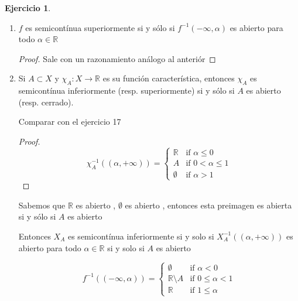 \documentclass[11pt]{report}
\newcommand{\R}{\mathbb{R}}
\newcommand{\Ra}{\Rightarrow}
\newcommand{\ra}{\rightarrow}
\theoremstyle{definition}
\newtheorem{ej}{Ejercicio}
\begin{document}
\begin{ej}
\begin{enumerate}
\begin{proof}
					Entonces tomamos $\epsilon ' = f(x_0) - \alpha $ tendríamos:

					$$\exists \delta >0 \text{ tal que } d(x,x_0 ) < \delta \Ra f(x_0) < f(x) + \epsilon ' \iff f(x) > \alpha \iff x \in f^{-1}(\alpha , +\infty)$$

					Pero entonces $x \in B(x_0,\delta) \iff d(x,x_0) < \delta \iff x \in f^{-1}(\alpha,+\infty)$

					Por lo tanto $B(x_0,\delta) \subseteq f^{-1}(\alpha,+\infty)$. Y esto vale para cualquier $x_0 \in X$

					Por lo tanto $f^{-1}(\alpha,+\infty)$ es abierto

			
				\end{proof}
				
				
			\item $f$ es semicontínua superiormente si y sólo si $f^{-1}(-\infty,\alpha)$ es abierto para todo $\alpha \in \R$
				\begin{proof}
					Sale con un razonamiento análogo al anteriór
				\end{proof}
				
				
			\item Si $A\subset X$ y $\chi_A : X \ra \R$ es su función característica, entonces $\chi_A$ es semicontínua inferiormente (resp. superiormente) si y sólo si $A$  es abierto (resp. cerrado).

				Comparar con el ejercicio 17
				\begin{proof}
					\[
						\chi_A^{-1}((\alpha,+\infty)) =
  					\begin{cases}
                                   		\R & \text{if $\alpha \leq 0$} \\
                                   		A & \text{if $0 < \alpha \leq 1 $} \\
  						\emptyset & \text{if $\alpha > 1$}
  					\end{cases}
					\]
				\end{proof}
				Sabemos que $\R$ es abierto , $\emptyset$ es abierto , entonces esta preimagen es abierta si y sólo si $A$ es abierto

				Entonces $X_A$ es semicontínua inferiormente si y solo si $X_A^{-1}((\alpha,+\infty))$ es abierto para todo $\alpha \in \R$ si y solo si $A$ es abierto
		
				\[
					f^{-1}((-\infty,\alpha)) =
  \begin{cases}
                                   \emptyset & \text{if $\alpha < 0$} \\
                                   \R \setminus A & \text{if $0 \leq \alpha < 1$} \\
  				   \R & \text{if $1 \leq \alpha$}
  \end{cases}
\]


\end{enumerate}
\end{ej}
\end{document}
